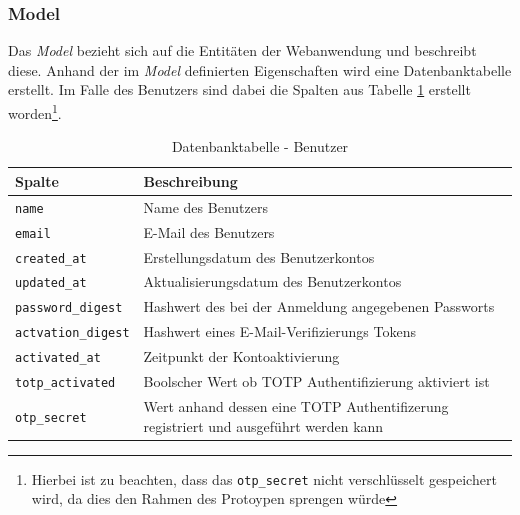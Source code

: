 \documentclass[11pt,a4paper,ngerman]{scrreprt}
\begin{document}
\subsubsection{Model}
Das \textit{Model} bezieht sich auf die Entitäten der Webanwendung und beschreibt diese. Anhand der im \textit{Model} definierten Eigenschaften wird eine Datenbanktabelle erstellt. Im Falle des Benutzers sind dabei die Spalten aus Tabelle \ref{table:db-user} erstellt worden\footnote{Hierbei ist zu beachten, dass das \texttt{otp\_secret} nicht verschlüsselt gespeichert wird, da dies den Rahmen des Protoypen sprengen würde}.
\begin{table}[htbp]
    \begin{tabularx}{\textwidth}{ lX }
        \toprule
        Spalte & Beschreibung \\ 
        \midrule
        \texttt{name} & Name des Benutzers \\
        \texttt{email} & E-Mail des Benutzers \\
        \texttt{created\_at} & Erstellungsdatum des Benutzerkontos \\
        \texttt{updated\_at} & Aktualisierungsdatum des Benutzerkontos \\
        \texttt{password\_digest} & Hashwert des bei der Anmeldung angegebenen Passworts \\
        \texttt{actvation\_digest} & Hashwert eines E-Mail-Verifizierungs Tokens \\
        \texttt{activated\_at} & Zeitpunkt der Kontoaktivierung \\
        \texttt{totp\_activated} & Boolscher Wert ob TOTP Authentifizierung aktiviert ist \\
        \texttt{otp\_secret} & Wert anhand dessen eine TOTP Authentifizerung registriert und ausgeführt werden kann \\
        \bottomrule
    \end{tabularx}
    \caption{Datenbanktabelle - Benutzer}
    \label{table:db-user}
\end{table}
\end{document}
